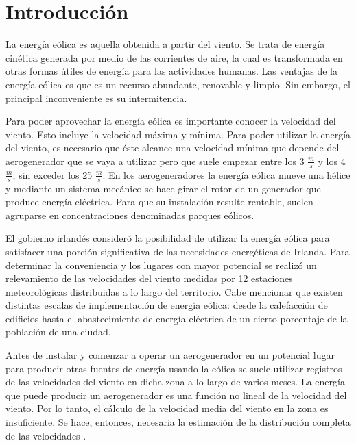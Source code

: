 \documentclass[journal, monochrome]{IEEEtran}
\begin{document}
%
\IEEEpeerreviewmaketitle
\vspace{1cm}

\section{Introducción}
\par
La energía eólica es aquella obtenida a partir del viento. Se trata de energía cinética generada por medio de las corrientes de aire, la cual es transformada en otras formas útiles de energía para las actividades humanas. Las ventajas de la energía eólica es que es un recurso abundante, renovable y limpio. Sin embargo, el principal inconveniente es su intermitencia. 
\par
Para poder aprovechar la energía eólica es importante conocer la velocidad del viento. Esto incluye la velocidad máxima y mínima. Para poder utilizar la energía del viento, es necesario que éste alcance una velocidad mínima que depende del aerogenerador que se vaya a utilizar pero que suele empezar entre los 3 $\frac{m}{s}$ y los 4 $\frac{m}{s}$, sin exceder los 25 $\frac{m}{s}$. En los aerogeneradores la energía eólica mueve una hélice y mediante un sistema mecánico se hace girar el rotor de un generador que produce energía eléctrica. Para que su instalación resulte rentable, suelen agruparse en concentraciones denominadas parques eólicos.
\par
El gobierno irlandés consideró la posibilidad de utilizar la energía eólica para satisfacer una porción significativa de las necesidades energéticas de Irlanda. Para determinar la conveniencia y los lugares con mayor potencial se realizó un relevamiento de las velocidades del viento medidas por 12 estaciones meteorológicas
distribuidas a lo largo del territorio. Cabe mencionar que existen distintas escalas de implementación de energía eólica: desde la calefacción de edificios hasta el abastecimiento de energía eléctrica de un cierto porcentaje de la población de una ciudad. 
\par
Antes de instalar y comenzar a operar un aerogenerador en un potencial lugar para producir otras fuentes de energía usando la eólica se suele utilizar registros de las velocidades del viento en dicha zona a lo largo de varios meses. La energía que puede producir un aerogenerador es una función no lineal de la velocidad del viento. Por lo tanto, el cálculo de la velocidad media del viento en la zona es insuficiente. Se hace, entonces, necesaria la estimación de la distribución completa de las velocidades \citep{haslett}.
\end{document}
